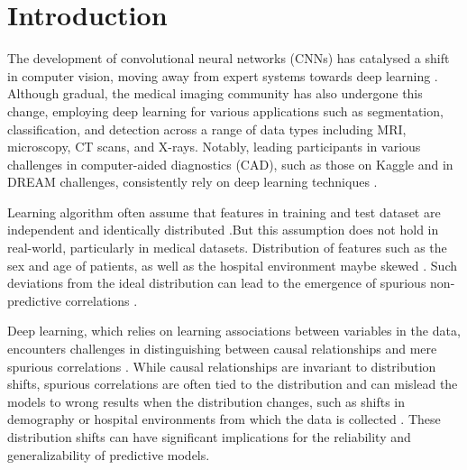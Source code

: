 \documentclass[12pt,DIV14,BCOR12mm,a4paper,footinclude=false,headinclude,parskip=half-,twoside,openright,cleardoublepage=empty,toc=index,bibliography=totoc,listof=totoc]{scrreprt}
\title{\maintitle}%
\subtitle{\translatedtitle}
\author{
\large
  \ifthenelse{\equal{\doclang}{german}}{
  \begin{tabular}{rp{7cm}}
    \Large 
    Autor:      & \Large \student \vspace*{2mm}\\
    Ausgabe:    & \startdate \\
    Abgabe:     & \submission \vspace*{3mm}\\
    Betreuer:   & \tutor \vspace*{2mm}\\
    Stichworte: & \keywords
  \end{tabular}
  }{
  \begin{tabular}{rp{7cm}}
    \Large 
    Author:             & \Large \student \vspace*{2mm}\\
    Date of work begin: & \startdate \\
    Date of submission: & \submission \vspace*{3mm}\\
    Supervisor:         & \tutor \vspace*{2mm}\\
    Keywords:           & \keywords 
  \end{tabular}
  }
  \bugfix
}
\date{}
\numberwithin{equation}{chapter}
\begin{document}
\maketitle
\cleardoublepage
{} %
\tableofcontents
\cleardoublepage
\setcounter{page}{1}


\chapter{Introduction}
The development of convolutional neural networks (CNNs) has catalysed a shift in computer vision, moving away from expert systems towards deep learning \cite{litjens_2017_a}. Although gradual, the medical imaging community has also undergone this change, employing deep learning for various applications such as segmentation, classification, and detection across a range of data types including MRI, microscopy, CT scans, and X-rays. Notably, leading participants in various challenges in computer-aided diagnostics (CAD), such as those on Kaggle and in DREAM challenges, consistently rely on deep learning techniques \cite{tsuneki_2022_deep}.

Learning algorithm often assume that features in training and test dataset are independent and identically distributed \cite{788640}.But this assumption does not hold in real-world, particularly in medical datasets. Distribution of features such as the sex and age of patients, as well as the hospital environment maybe skewed \cite{larrazabal_2020_gender} \cite{sanchez_2022_causal} \cite{dazrodrguez_2023_gender}. Such deviations from the ideal distribution can lead to the emergence of spurious non-predictive correlations\cite{lynch2023spawrious} \cite{DBLP:journals/corr/abs-2004-07780}.

Deep learning, which relies on learning associations between variables in the data, encounters challenges in distinguishing between causal relationships and mere spurious correlations \cite{sanchez_2022_causal} \cite{DBLP:journals/corr/abs-2004-07780}. While causal relationships are invariant to distribution shifts, spurious correlations are often tied to the distribution and can mislead the models to wrong results when the distribution changes, such as shifts in demography or hospital environments from which the data is collected \cite{DBLP:journals/corr/abs-1807-04975} \cite{DBLP:journals/corr/abs-1911-08731} \cite{sanchez_2022_causal}. These distribution shifts can have significant implications for the reliability and generalizability of predictive models.
\end{document}
